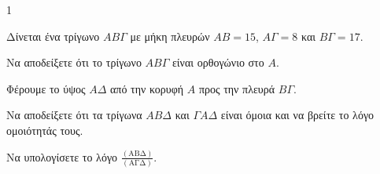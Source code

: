 \begin{ylh}{1}
    \item [Πυθαγόρειο Θεώρημα - Ομοιότητα Τριγώνων]
\end{ylh}
\begin{figure}
    \centering
\end{figure}
Δίνεται ένα τρίγωνο $ΑΒΓ$ με μήκη πλευρών $ΑΒ=15$, $ΑΓ=8$ και $ΒΓ=17$.

\begin{alist}
    \item Να αποδείξετε ότι το τρίγωνο $ΑΒΓ$ είναι ορθογώνιο στο $A$. 
    
    \item Φέρουμε το ύψος $ΑΔ$ από την κορυφή $Α$ προς την πλευρά $ΒΓ$.
    \begin{rlist}
        \item Να αποδείξετε ότι τα τρίγωνα $ΑΒΔ$ και $ΓΑΔ$ είναι όμοια και να βρείτε το λόγο ομοιότητάς τους. 
        \item Να υπολογίσετε το λόγο $\frac{(\mathrm{AB\Delta})}{(\mathrm{A\Gamma\Delta})}$. 
    \end{rlist}
\end{alist}